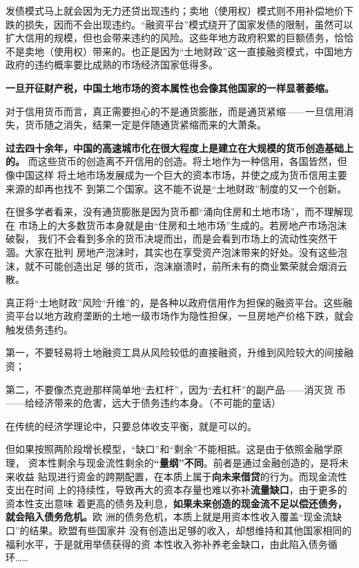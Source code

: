 发债模式马上就会因为无力还贷出现违约；卖地（使用权）模式则不用补偿地价下跌的损失，因而不会出现违约。“融资平台”模式绕开了国家发债的限制，虽然可以扩大信用的规模，但也会带来违约的风险。这些年地方政府积累的巨额债务，恰恰不是卖地（使用权）带来的。也正是因为“土地财政”这一直接融资模式，中国地方政府的违约概率要比成熟的市场经济国家低得多。


\textbf{一旦开征财产税，中国土地市场的资本属性也会像其他国家的一样显著萎缩。}

对于信用货币而言，真正需要担心的不是通货膨胀，而是通货紧缩——一旦信用消失，货币随之消失，结果一定是伴随通货紧缩而来的大萧条。

\textbf{过去四十余年，中国的高速城市化在很大程度上是建立在大规模的货币创造基础上的。}
而这些货币的创造离不开信用的创造。将土地作为一种信用，各国皆然，但像中国这样
将土地市场发展成为一个巨大的资本市场，并使之成为货币信用主要来源的却再也找不
到第二个国家。这不能不说是“土地财政”制度的又一个创新。

在很多学者看来，没有通货膨胀是因为货币都“涌向住房和土地市场”，而不理解现在
市场上的大多数货币本身就是由“住房和土地市场”生成的。若房地产市场泡沫破裂，
我们不会看到多余的货币决堤而出，而是会看到市场上的流动性突然干涸。大家在批判
房地产泡沫时，其实也在享受资产泡沫带来的好处。没有这些泡沫，就不可能创造出足
够的货币，泡沫崩溃时，前所未有的商业繁荣就会烟消云散。


真正将“土地财政”风险“升维”的，是各种以政府信用作为担保的融资平台。这些融资平台以地方政府垄断的土地一级市场作为隐性担保，一旦房地产价格下跌，就会触发债务违约。

第一，不要轻易将土地融资工具从风险较低的直接融资，升维到风险较大的间接融资；

第二，不要像杰克逊那样简单地“去杠杆”，因为“去杠杆”的副产品——消灭货
币——给经济带来的危害，远大于债务违约本身。（不可能的童话）

在传统的经济学理论中，只要总体收支平衡，就是可以的。

但如果按照两阶段增长模型，“缺口”和“剩余”不能相抵。这是由于依照金融学原理，
资本性剩余与现金流性剩余的\textbf{“量纲”不同}。前者是通过金融创造的，是将未来收益
贴现进行资金的跨期配置，在本质上属于\textbf{向未来借贷}的行为。而现金流性支出在时间
上的持续性，导致再大的资本存量也难以弥补\textbf{流量缺口}，由于更多的资本性支出意味
着更高的债务及利息，\textbf{如果未来创造的现金流不足以偿还债务，就会陷入债务危机。}欧
洲的债务危机，本质上就是用资本性收入覆盖“现金流缺口”的结果。欧盟有些国家并
没有创造出足够的收入，却想维持和其他国家相同的福利水平，于是就用举债获得的资
本性收入弥补养老金缺口，由此陷入债务循环……


